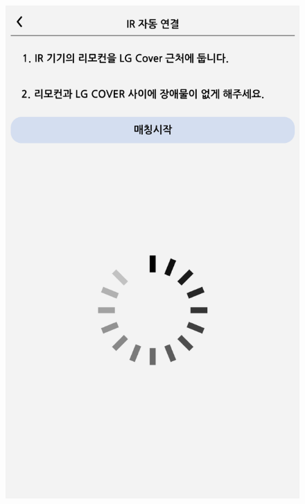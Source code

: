 \documentclass[conference]{IEEEtran}
\begin{document}
\begin{enumerate}[label=\arabic*.]
\begin{enumerate}[label=\alph*.]
\begin{itemize}
\begin{figure}[H]\centering \includegraphics[scale=0.4]{images/sw-spec-16.png}\end{figure}
\end{itemize}
\end{enumerate}
\end{enumerate}
\end{document}
